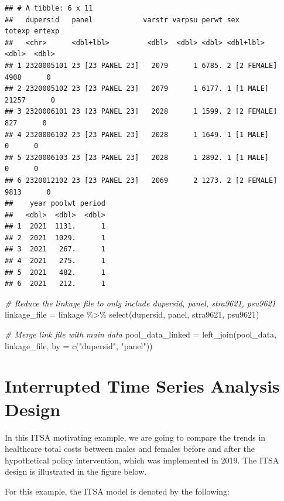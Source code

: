 \documentclass[
]{book}
\newenvironment{Shaded}{\begin{snugshade}}{\end{snugshade}}
\newcommand{\AttributeTok}[1]{\textcolor[rgb]{0.77,0.63,0.00}{#1}}
\newcommand{\CommentTok}[1]{\textcolor[rgb]{0.56,0.35,0.01}{\textit{#1}}}
\newcommand{\FunctionTok}[1]{\textcolor[rgb]{0.00,0.00,0.00}{#1}}
\newcommand{\NormalTok}[1]{#1}
\newcommand{\OtherTok}[1]{\textcolor[rgb]{0.56,0.35,0.01}{#1}}
\newcommand{\SpecialCharTok}[1]{\textcolor[rgb]{0.00,0.00,0.00}{#1}}
\newcommand{\StringTok}[1]{\textcolor[rgb]{0.31,0.60,0.02}{#1}}
\begin{document}
\begin{verbatim}
## # A tibble: 6 x 11
##   dupersid   panel            varstr varpsu perwt sex          totexp ertexp
##   <chr>      <dbl+lbl>         <dbl>  <dbl> <dbl> <dbl+lbl>     <dbl>  <dbl>
## 1 2320005101 23 [23 PANEL 23]   2079      1 6785. 2 [2 FEMALE]   4908      0
## 2 2320005102 23 [23 PANEL 23]   2079      1 6177. 1 [1 MALE]    21257      0
## 3 2320006101 23 [23 PANEL 23]   2028      1 1599. 2 [2 FEMALE]    827      0
## 4 2320006102 23 [23 PANEL 23]   2028      1 1649. 1 [1 MALE]        0      0
## 5 2320006103 23 [23 PANEL 23]   2028      1 2892. 1 [1 MALE]        0      0
## 6 2320012102 23 [23 PANEL 23]   2069      2 1273. 2 [2 FEMALE]   9813      0
##    year poolwt period
##   <dbl>  <dbl>  <dbl>
## 1  2021  1131.      1
## 2  2021  1029.      1
## 3  2021   267.      1
## 4  2021   275.      1
## 5  2021   482.      1
## 6  2021   212.      1
\end{verbatim}

\begin{Shaded}
\begin{Highlighting}[]
\CommentTok{\# Reduce the linkage file to only include dupersid, panel, stra9621, psu9621}
\NormalTok{linkage\_file }\OtherTok{=}\NormalTok{ linkage }\SpecialCharTok{\%\textgreater{}\%}
  \FunctionTok{select}\NormalTok{(dupersid, panel, stra9621, psu9621)}

\CommentTok{\# Merge link file with main data}
\NormalTok{pool\_data\_linked }\OtherTok{=} \FunctionTok{left\_join}\NormalTok{(pool\_data,}
\NormalTok{                             linkage\_file, }
                             \AttributeTok{by =} \FunctionTok{c}\NormalTok{(}\StringTok{"dupersid"}\NormalTok{, }\StringTok{"panel"}\NormalTok{))}
\end{Highlighting}
\end{Shaded}

\hypertarget{interrupted-time-series-analysis-design}{%
\section{Interrupted Time Series Analysis Design}\label{interrupted-time-series-analysis-design}}

In this ITSA motivating example, we are going to compare the trends in healthcare total costs between males and females before and after the hypothetical policy intervention, which was implemented in 2019. The ITSA design is illustrated in the figure below.

For this example, the ITSA model is denoted by the following:
\end{document}
